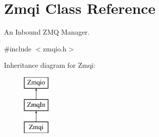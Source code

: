 \hypertarget{classZmqi}{\section{Zmqi Class Reference}
\label{classZmqi}
}


An Inbound Z\-M\-Q Manager.  




{\ttfamily \#include $<$zmqio.\-h$>$}

Inheritance diagram for Zmqi\-:\begin{figure}[H]
\begin{center}
\leavevmode
\includegraphics[height=3.000000cm]{classZmqi}
\end{center}
\end{figure}
